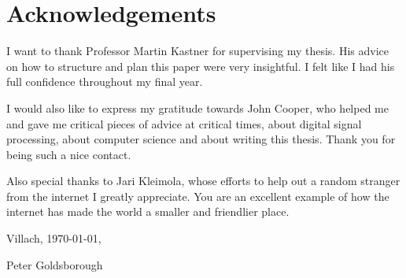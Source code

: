 \chapter*{Acknowledgements}

I want to thank Professor Martin Kastner for supervising my thesis. His advice on how to structure and plan this paper were very insightful. I felt like I had his full confidence throughout my final year. \parbreak

I would also like to express my gratitude towards John Cooper, who helped me and gave me critical pieces of advice at critical times, about digital signal processing, about computer science and about writing this thesis. Thank you for being such a nice contact. \parbreak

Also special thanks to Jari Kleimola, whose efforts to help out a random stranger from the internet I greatly appreciate. You are an excellent example of how the internet has made the world a smaller and friendlier place. \parbreak

Villach, \today, \parbreak

\noindent Peter Goldsborough
